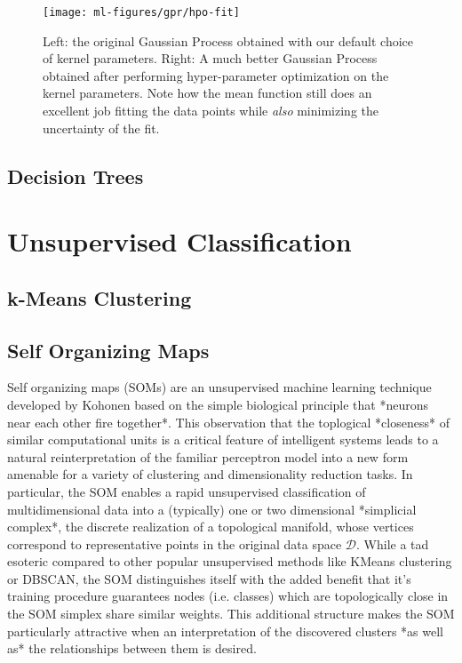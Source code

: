 \begin{figure}[h]
  \centering
  \texttt{[image: ml-figures/gpr/hpo-fit]}
  \caption{Left: the original Gaussian Process obtained with our default choice of kernel parameters. Right: A much better Gaussian Process obtained after performing hyper-parameter optimization on the kernel parameters. Note how the mean function still does an excellent job fitting the data points while \textit{also} minimizing the uncertainty of the fit.}
  \label{fig:gpr-fit-comparison}
\end{figure}



\subsection{Decision Trees}



\section{Unsupervised Classification}
\subsection{k-Means Clustering}
\subsection{Self Organizing Maps}

Self organizing maps (SOMs) are an unsupervised machine learning technique developed by Kohonen \cite{kohonen-original} based on the simple biological principle that *neurons near each other fire together*. This observation that the toplogical *closeness* of similar computational units is a critical feature of intelligent systems leads to a natural reinterpretation of the familiar perceptron model into a new form amenable for a variety of clustering and dimensionality reduction tasks. In particular, the SOM enables a rapid unsupervised classification of multidimensional data into a (typically) one or two dimensional *simplicial complex*, the discrete realization of a topological manifold, whose vertices correspond to representative points in the original data space $\mathcal{D}$. While a tad esoteric compared to other popular unsupervised methods like KMeans clustering or DBSCAN, the SOM distinguishes itself with the added benefit that it's training procedure guarantees nodes (i.e. classes) which are topologically close in the SOM simplex share similar weights. This additional structure makes the SOM particularly attractive when an interpretation of the discovered clusters *as well as* the relationships between them is desired.

